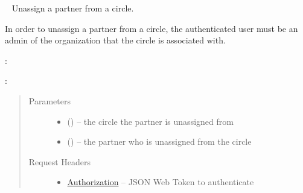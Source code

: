 \documentclass[letterpaper,10pt,english]{sphinxmanual}
\begin{document}
\begin{fulllineitems}
\label{\detokenize{resources/circle:delete--circles-(circle_id)-members-(partner_id)}}~
Unassign a partner from a circle.

In order to unassign a partner from a circle, the authenticated user
must be an admin of the organization that the circle is associated
with.

:

\begin{sphinxVerbatim}[commandchars=\\\{\}]
  
 
 
\end{sphinxVerbatim}

:

\begin{sphinxVerbatim}[commandchars=\\\{\}]
  
\end{sphinxVerbatim}
\begin{quote}\begin{description}
\item[{Parameters}] \leavevmode\begin{itemize}
\item {} 
 () -- the circle the partner is unassigned from

\item {} 
 () -- the partner who is unassigned from the circle

\end{itemize}

\item[{Request Headers}] \leavevmode\begin{itemize}
\item {} 
\href{http://tools.ietf.org/html/rfc7235\#section-4.2}{Authorization} -- JSON Web Token to authenticate

\end{itemize}


\end{description}
\end{quote}
\end{fulllineitems}
\end{document}
